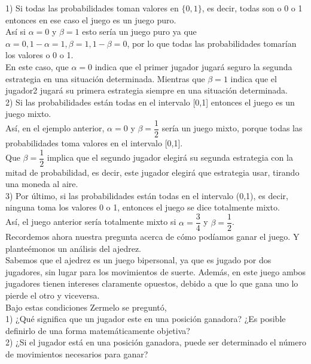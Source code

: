 \documentclass[10pt,a4paper]{book}
\begin{document}
1) Si todas las probabilidades toman valores en $\{0,1\}$, es decir, todas son o 0 o 1 entonces en ese caso el juego es un juego puro.\\
Así si $\alpha=0$ y $\beta=1$ esto sería un juego puro ya que $\alpha=0, 1-\alpha=1, \beta=1, 1-\beta=0$, por lo que todas las probabilidades tomarían los valores o 0 o 1. \\
En este caso, que $\alpha=0$ indica que el primer jugador jugará seguro la segunda estrategia en una situación determinada. Mientras que $\beta=1$ indica que el jugador2 jugará su primera estrategia siempre en una situación determinada.\\

2) Si las probabilidades están todas en el intervalo [0,1] entonces el juego es un juego mixto.\\
Así, en el ejemplo anterior, $\alpha=0$ y $\beta=\dfrac{1}{2}$ sería un juego mixto, porque todas las probabilidades toma valores en el intervalo [0,1]. \\
Que $\beta=\dfrac{1}{2}$ implica que el segundo jugador elegirá su segunda estrategia con la mitad de probabilidad, es decir, este jugador elegirá que estrategia usar, tirando una moneda al aire.\\

3) Por último, si las probabilidades están todas en el intervalo (0,1), es decir, ninguna toma los valores 0 o 1, entonces el juego se dice totalmente mixto.\\
Así, el juego anterior sería totalmente mixto si $\alpha=\dfrac{3}{4}$ y $\beta=\dfrac{1}{2}$.\\


Recordemos ahora nuestra pregunta acerca de cómo podíamos ganar el juego. Y planteémonos un análisis del ajedrez. \\


Sabemos que el ajedrez es un juego bipersonal, ya que es jugado por dos jugadores, sin lugar para los movimientos de suerte. Además, en este juego ambos jugadores tienen intereses claramente opuestos, debido a que lo que gana uno lo pierde el otro y viceversa. \\

Bajo estas condiciones Zermelo se preguntó, \\

1) ¿Qué significa que un jugador este en una posición ganadora? ¿Es posible definirlo de una forma matemáticamente objetiva?\\

2) ¿Si el jugador está en una posición ganadora, puede ser determinado el número de movimientos necesarios para ganar?\\
\end{document}
